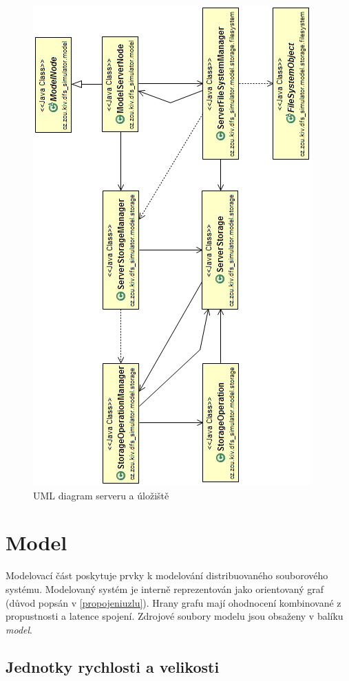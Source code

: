 \documentclass[czech,DP]{thesiskiv}
\begin{document}
\begin{figure}[H]
\centering
	\includegraphics{img/uml_uloziste.png}
\caption{UML diagram serveru a úložiště}
\label{fig:uml_uloziste}
\end{figure}

\section{Model}

Modelovací část poskytuje prvky k modelování distribuovaného souborového systému. Modelovaný systém je interně reprezentován jako orientovaný graf (důvod popsán v \ref{propojeniuzlu}). Hrany grafu mají ohodnocení kombinované z propustnosti a latence spojení. Zdrojové soubory modelu jsou obsaženy v balíku \textit{model}.

\subsection{Jednotky rychlosti a velikosti}
\end{document}
